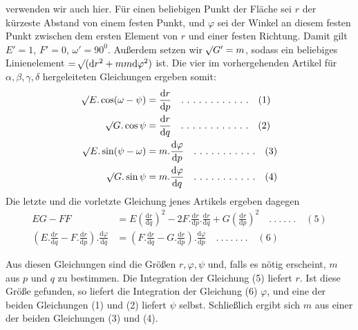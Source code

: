 %
verwenden wir auch hier. Für einen beliebigen Punkt der Fläche sei \(r\) der kürzeste Abstand von einem festen Punkt, und \(\varphi\) sei der Winkel an diesem festen Punkt zwischen dem ersten Element von \(r\) und einer festen Richtung. Damit gilt \(E'=1\), \(F'=0\), \(\omega'=90^0\). Außerdem setzen wir \(\mathord{{}^{}\!\surd}G'=m\), sodass ein beliebiges Linienelement \(=\mathord{{}^{}\!\surd}(\mathrm{d}r^2+mm\mathrm{d}\varphi^2)\) ist. Die vier im vorhergehenden Artikel für \(\alpha,\beta,\gamma,\delta\) hergeleiteten Gleichungen ergeben somit:
\[
\begin{aligned}
\mathord{{}^{}\!\surd}E\mathord{.}\cos(\omega-\psi)&=\frac{\mathrm{d}r}{\mathrm{d}p}\quad .\ .\ .\ .\ .\ .\ .\ .\ .\ .\ .\ .\quad(1)\\
\mathord{{}^{}\!\surd}G\mathord{.}\cos\psi&=\frac{\mathrm{d}r}{\mathrm{d}q}\quad .\ .\ .\ .\ .\ .\ .\ .\ .\ .\ .\ .\quad(2)\\
\mathord{{}^{}\!\surd}E\mathord{.}\sin(\psi-\omega)&=m\mathord{.}\frac{\mathrm{d}\varphi}{\mathrm{d}p}\quad .\ .\ .\ .\ .\ .\ .\ .\ .\ .\ .\quad(3)\\
\mathord{{}^{}\!\surd}G\mathord{.}\sin\psi&=m\mathord{.}\frac{\mathrm{d}\varphi}{\mathrm{d}q}\quad .\ .\ .\ .\ .\ .\ .\ .\ .\ .\ .\quad(4)
\end{aligned}
\]
Die letzte und die vorletzte Gleichung jenes Artikels ergeben dagegen
\[
\begin{aligned}
EG-FF&=E(\frac{\mathrm{d}r}{\mathrm{d}q})^2-2F\mathord{.}\frac{\mathrm{d}r}{\mathrm{d}p}\mathord{.}\frac{\mathrm{d}r}{\mathrm{d}q}+G(\frac{\mathrm{d}r}{\mathrm{d}p})^2\quad .\ .\ .\ .\ .\ .\quad(5)\\
(E\mathord{.}\frac{\mathrm{d}r}{\mathrm{d}q}-F\mathord{.}\frac{\mathrm{d}r}{\mathrm{d}p})\mathord{.}\frac{\mathrm{d}\varphi}{\mathrm{d}q}&=(F\mathord{.}\frac{\mathrm{d}r}{\mathrm{d}q}-G\mathord{.}\frac{\mathrm{d}r}{\mathrm{d}p})\mathord{.}\frac{\mathrm{d}\varphi}{\mathrm{d}p}\quad .\ .\ .\ .\ .\ .\ .\quad(6)
\end{aligned}
\]

Aus diesen Gleichungen sind die Größen \(r,\varphi,\psi\) und, falls es nötig erscheint, \(m\) aus \(p\) und \(q\) zu bestimmen. Die Integration der Gleichung (5) liefert \(r\). Ist diese Größe gefunden, so liefert die Integration der Gleichung (6) \(\varphi\), und eine der beiden Gleichungen (1) und (2) liefert \(\psi\) selbst. Schließlich ergibt sich \(m\) aus einer der beiden Gleichungen (3) und (4).

